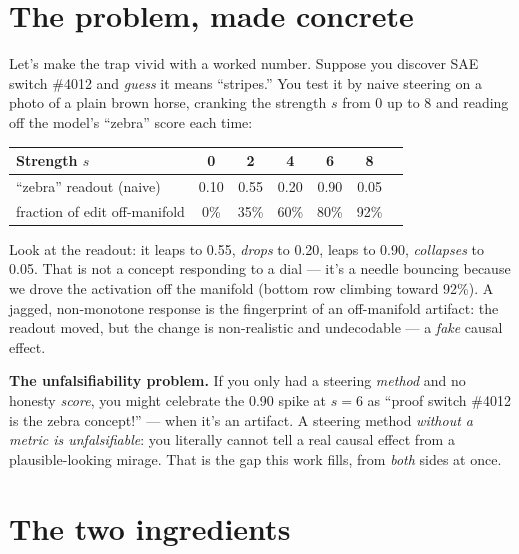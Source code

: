 \documentclass[12pt]{article}
\newcommand{\offm}[1]{\textcolor{offman}{#1}}
\begin{document}
\section{The problem, made concrete}

Let's make the trap vivid with a worked number. Suppose you discover SAE switch \#4012 and \emph{guess} it means ``stripes.'' You test it by naive steering on a photo of a plain brown horse, cranking the strength $s$ from 0 up to 8 and reading off the model's ``zebra'' score each time:

\begin{center}
\renewcommand{\arraystretch}{1.2}
\begin{tabular}{lcccccc}
\hline
Strength $s$ & 0 & 2 & 4 & 6 & 8 \\
\hline
``zebra'' readout (naive) & 0.10 & 0.55 & 0.20 & 0.90 & 0.05 \\
fraction of edit \offm{off-manifold} & 0\% & 35\% & 60\% & 80\% & 92\% \\
\hline
\end{tabular}
\end{center}

Look at the readout: it leaps to 0.55, \emph{drops} to 0.20, leaps to 0.90, \emph{collapses} to 0.05. That is not a concept responding to a dial --- it's a needle bouncing because we drove the activation off the manifold (bottom row climbing toward 92\%). A jagged, non-monotone response is the fingerprint of an \offm{off-manifold artifact}: the readout moved, but the change is non-realistic and undecodable --- a \emph{fake} causal effect.

\begin{keybox}
\textbf{The unfalsifiability problem.} If you only had a steering \emph{method} and no honesty \emph{score}, you might celebrate the 0.90 spike at $s=6$ as ``proof switch \#4012 is the zebra concept!'' --- when it's an artifact. A steering method \emph{without a metric is unfalsifiable}: you literally cannot tell a real causal effect from a plausible-looking mirage. That is the gap this work fills, from \emph{both} sides at once.
\end{keybox}

\section{The two ingredients}
\end{document}
